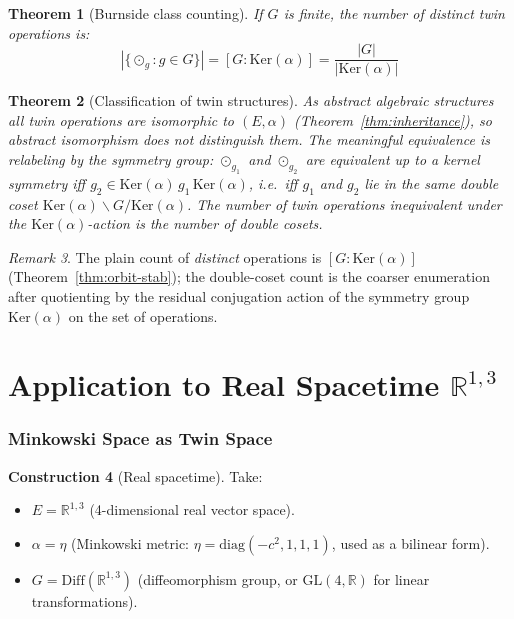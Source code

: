 \documentclass[12pt]{article}
\theoremstyle{plain}
\newtheorem{theorem}{Theorem}[section]
\theoremstyle{definition}
\newtheorem{construction}[theorem]{Construction}
\theoremstyle{remark}
\newtheorem{remark}[theorem]{Remark}
\newcommand{\Ker}{\mathrm{Ker}}
\newcommand{\Diff}{\mathrm{Diff}}
\newcommand{\GL}{\mathrm{GL}}
\newcommand{\RR}{\mathbb{R}}
\begin{document}
\begin{theorem}[Burnside class counting]\label{thm:burnside}
If $G$ is finite, the number of distinct twin operations is:
\begin{equation}
|\{\odot_g : g \in G\}| = [G : \Ker(\alpha)] = \frac{|G|}{|\Ker(\alpha)|}
\end{equation}
\end{theorem}

\begin{theorem}[Classification of twin structures]\label{thm:classification}
As abstract algebraic structures all twin operations are isomorphic to $(E,\alpha)$ (Theorem~\ref{thm:inheritance}), so abstract isomorphism does not distinguish them. The meaningful equivalence is relabeling by the symmetry group: $\odot_{g_1}$ and $\odot_{g_2}$ are equivalent up to a kernel symmetry iff $g_2 \in \Ker(\alpha)\, g_1\, \Ker(\alpha)$, i.e.\ iff $g_1$ and $g_2$ lie in the same double coset $\Ker(\alpha) \backslash G / \Ker(\alpha)$. The number of twin operations inequivalent under the $\Ker(\alpha)$-action is the number of double cosets.
\end{theorem}

\begin{remark}
The plain count of \emph{distinct} operations is $[G:\Ker(\alpha)]$ (Theorem~\ref{thm:orbit-stab}); the double-coset count is the coarser enumeration after quotienting by the residual conjugation action of the symmetry group $\Ker(\alpha)$ on the set of operations.
\end{remark}



\part{Application to Real Spacetime $\RR^{1,3}$}

\section{Minkowski Space as Twin Space}
\label{sec:minkowski}

\begin{construction}[Real spacetime]\label{constr:real}
Take:
\begin{itemize}
    \item $E = \RR^{1,3}$ (4-dimensional real vector space).
    \item $\alpha = \eta$ (Minkowski metric: $\eta = \mathrm{diag}(-c^2, 1, 1, 1)$, used as a bilinear form).
    \item $G = \Diff(\RR^{1,3})$ (diffeomorphism group, or $\GL(4,\RR)$ for linear transformations).
\end{itemize}
\end{construction}
\end{document}
